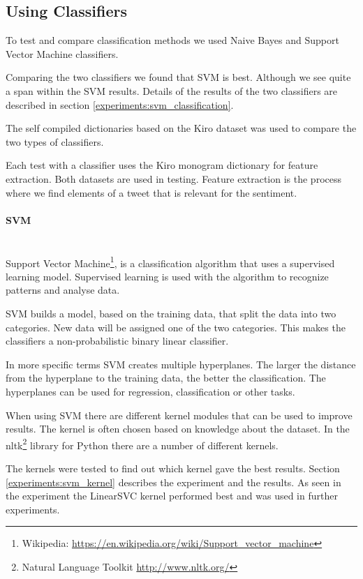 \subsection{Using Classifiers}\label{sentiment:classifier_classification}
To test and compare classification methods we used Naive Bayes and
Support Vector Machine classifiers. 

Comparing the two classifiers we found that SVM is best. Although we see quite a
span within the SVM results. Details of the results of the two classifiers are
described in section \ref{experiments:svm_classification}. 

The self compiled dictionaries based on the Kiro dataset was used to compare
the two types of classifiers. 

Each test with a classifier uses the Kiro monogram dictionary for feature
extraction. Both datasets are used in testing.
Feature extraction is the process where we find elements of a tweet that is
relevant for the sentiment.  

\paragraph{SVM}\label{sentiment:svm_classification}
\hspace{0pt}\\
Support Vector Machine\footnote{Wikipedia:
\url{https://en.wikipedia.org/wiki/Support_vector_machine}}, is a classification
algorithm that uses a supervised learning model. Supervised learning is used
with the algorithm to recognize patterns and analyse data. 

SVM builds a model, based on the training data, that split the data into two
categories. New data will be assigned one of the two categories. This makes the
classifiers a non-probabilistic binary linear classifier. 

In more specific terms SVM creates multiple hyperplanes. The larger the
distance from the hyperplane to the training data, the better the
classification. The hyperplanes can be used for regression, classification or
other tasks. 

When using SVM there are different kernel modules that can be used
to improve results. The kernel is often chosen based on knowledge about the
dataset. In the nltk\footnote{Natural Language Toolkit
\url{http://www.nltk.org/}} library for Python there are a number of different
kernels. 

The kernels were tested to find out which kernel gave the best results. Section
\ref{experiments:svm_kernel} describes the experiment and the results. As
seen in the experiment the LinearSVC kernel performed best and was used in
further experiments.
%

